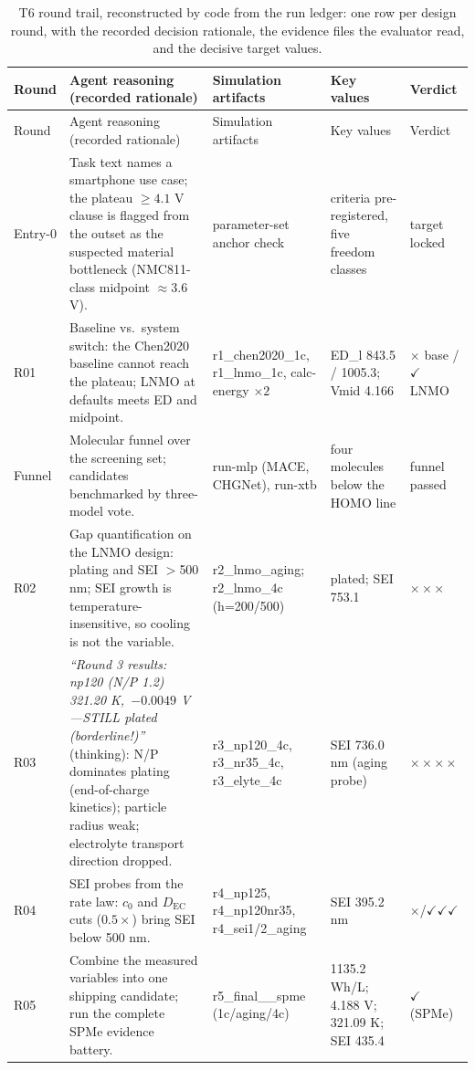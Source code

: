 \footnotesize
\addtolength{\tabcolsep}{-2pt}
\begin{longtable}{p{0.95cm}p{4.7cm}p{2.1cm}p{2.2cm}p{1.1cm}}
\caption{T6 round trail, reconstructed by code from the run ledger:
one row per design round, with the recorded decision rationale, the
evidence files the evaluator read, and the decisive target
values.}
\label{tab:trail}\\
\toprule
Round & Agent reasoning (recorded rationale) & Simulation artifacts & Key values & Verdict \\
\midrule
\endfirsthead
\toprule
Round & Agent reasoning (recorded rationale) & Simulation artifacts & Key values & Verdict \\
\midrule
\endhead
\bottomrule
\endlastfoot
Entry-0 & Task text names a smartphone use case; the plateau $\geq 4.1$ V clause is flagged from the outset as the suspected material bottleneck (NMC811-class midpoint $\approx 3.6$ V). & parameter-set anchor check & criteria pre-registered, five freedom classes & target locked \\
R01 & Baseline vs.\ system switch: the Chen2020 baseline cannot reach the plateau; LNMO at defaults meets ED and midpoint. & r1\_chen2020\_1c, r1\_lnmo\_1c, calc-energy $\times2$ & ED\_l 843.5 / 1005.3; Vmid 4.166 & $\times$ base / $\checkmark$ LNMO \\
Funnel & Molecular funnel over the screening set; candidates benchmarked by three-model vote. & run-mlp (MACE, CHGNet), run-xtb & four molecules below the HOMO line & funnel passed \\
R02 & Gap quantification on the LNMO design: plating and SEI $>$500 nm; SEI growth is temperature-insensitive, so cooling is not the variable. & r2\_lnmo\_aging; r2\_lnmo\_4c (h=200/500) & plated; SEI 753.1 & $\times\times\times$ \\
R03 & \emph{``Round 3 results: np120 (N/P 1.2) 321.20 K,\ $\mathrm{-0.0049}$ V---STILL plated (borderline!)''} (thinking): N/P dominates plating (end-of-charge kinetics); particle radius weak; electrolyte transport direction dropped. & r3\_np120\_4c, r3\_nr35\_4c, r3\_elyte\_4c & SEI 736.0 nm (aging probe) & $\times\times\times\times$ \\
R04 & SEI probes from the rate law: $c_0$ and $D_{\mathrm{EC}}$ cuts ($0.5\times$) bring SEI below 500 nm. & r4\_np125, r4\_np120nr35, r4\_sei1/2\_aging & SEI 395.2 nm & $\times$/$\checkmark\checkmark\checkmark$ \\
R05 & Combine the measured variables into one shipping candidate; run the complete SPMe evidence battery. & r5\_final\_\_spme (1c/aging/4c) & 1135.2 Wh/L; 4.188 V; 321.09 K; SEI 435.4 & $\checkmark$ (SPMe) \\

\end{longtable}
